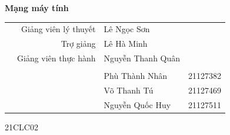 \documentclass[14pt, a4paper]{extarticle}
\begin{document}
\begin{titlepage}
    \bigskip
    \bigskip

    \centerline{\LARGE{\textbf{Mạng máy tính}}}
    \raggedright
    \bigskip
    \medskip
    \begin{center}

        \begin{table}[h]
            \begin{tabular}{rrlc}
                 & Giảng viên lý thuyết & Lê Ngọc Sơn       &          \\
                 & Trợ giảng            & Lê Hà Minh        &          \\
                 & Giảng viên thực hành & Nguyễn Thanh Quân &          \\
                 &                      &                   &          \\
                 &                      & Phù Thành Nhân    & 21127382 \\
                 &                      & Võ Thanh Tú       & 21127469 \\
                 &                      & Nguyễn Quốc Huy   & 21127511
            \end{tabular}
        \end{table}
        \LARGE{21CLC02}
    \end{center}
\end{titlepage}


\pagestyle{fancy}
\fancyhf{}
\addtolength{\topmargin}{-0.70894pt}
\setlength{\headheight}{12.70894pt}

\rfoot{\textbf{\thepage}}

\renewcommand*{\contentsname}{Mục lục}
\tableofcontents
\newpage
\end{document}
